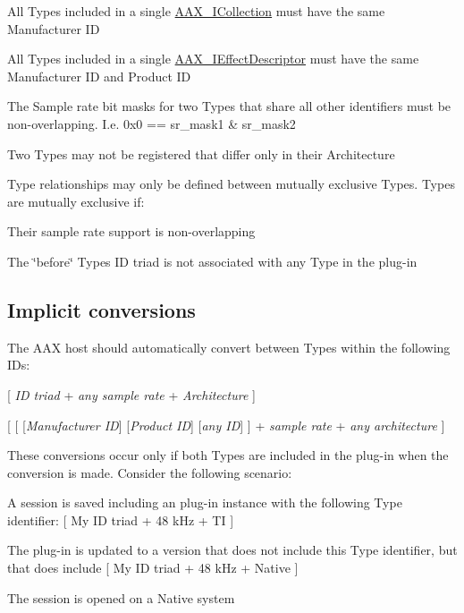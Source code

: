 \begin{DoxyItemize}
\item All Types included in a single \mbox{\hyperlink{a01777}{A\+A\+X\+\_\+\+I\+Collection}} must have the same Manufacturer ID  
\item All Types included in a single \mbox{\hyperlink{a01813}{A\+A\+X\+\_\+\+I\+Effect\+Descriptor}} must have the same Manufacturer ID and Product ID  
\item The Sample rate bit masks for two Types that share all other identifiers must be non-\/overlapping. I.\+e. {\ttfamily 0x0 == sr\+\_\+mask1 \& sr\+\_\+mask2}  
\item Two Types may not be registered that differ only in their Architecture  
\item Type relationships may only be defined between mutually exclusive Types. Types are mutually exclusive if\+: 
\begin{DoxyItemize}
\item Their sample rate support is non-\/overlapping  
\item The \char`\"{}before\char`\"{} Type\textquotesingle{}s ID triad is not associated with any Type in the plug-\/in  
\end{DoxyItemize}
\end{DoxyItemize}\hypertarget{a00826_advancedTopics_relatedTypes_implicitconversions}{}\subsection{Implicit conversions}\label{a00826_advancedTopics_relatedTypes_implicitconversions}
The A\+AX host should automatically convert between Types within the following I\+Ds\+: 
\begin{DoxyItemize}
\item \mbox{[} {\itshape ID triad} + {\itshape any sample rate} + {\itshape Architecture} \mbox{]}  
\item \mbox{[} \mbox{[} \mbox{[}{\itshape Manufacturer ID}\mbox{]} \mbox{[}{\itshape Product ID}\mbox{]} \mbox{[}{\itshape any ID}\mbox{]} \mbox{]} + {\itshape sample rate} + {\itshape any architecture} \mbox{]}  
\end{DoxyItemize}

These conversions occur only if both Types are included in the plug-\/in when the conversion is made. Consider the following scenario\+: 
\begin{DoxyEnumerate}
\item A session is saved including an plug-\/in instance with the following Type identifier\+: \mbox{[} My ID triad + 48 k\+Hz + TI \mbox{]}  
\item The plug-\/in is updated to a version that does not include this Type identifier, but that does include \mbox{[} My ID triad + 48 k\+Hz + Native \mbox{]}  
\item The session is opened on a Native system  
\end{DoxyEnumerate}

